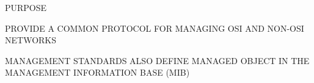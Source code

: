 %




\begin{bwslide}

\begin{nrtc}
\item	PURPOSE
	\begin{nrtc}
	\item	PROVIDE A COMMON PROTOCOL FOR MANAGING OSI AND NON-OSI NETWORKS
	\item	MANAGEMENT STANDARDS ALSO DEFINE MANAGED OBJECT IN THE
		MANAGEMENT INFORMATION BASE (MIB)
	\end{nrtc}
\end{nrtc}
\end{bwslide}


